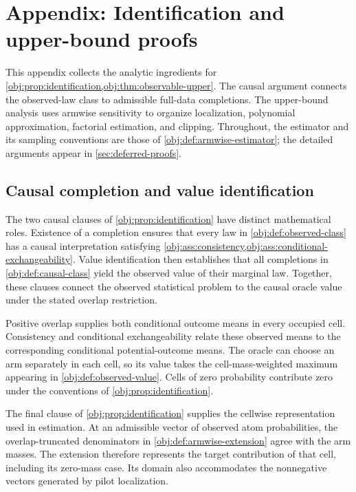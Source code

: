 \section{Appendix: Identification and upper-bound proofs}\label{sec:appendix-upper}

This appendix collects the analytic ingredients for \cref{obj:prop:identification,obj:thm:observable-upper}. The causal argument connects the observed-law class to admissible full-data completions. The upper-bound analysis uses armwise sensitivity to organize localization, polynomial approximation, factorial estimation, and clipping. Throughout, the estimator and its sampling conventions are those of \cref{obj:def:armwise-estimator}; the detailed arguments appear in \cref{sec:deferred-proofs}.

\subsection{Causal completion and value identification}

The two causal clauses of \cref{obj:prop:identification} have distinct mathematical roles. Existence of a completion ensures that every law in \cref{obj:def:observed-class} has a causal interpretation satisfying \cref{obj:ass:consistency,obj:ass:conditional-exchangeability}. Value identification then establishes that all completions in \cref{obj:def:causal-class} yield the observed value of their marginal law. Together, these clauses connect the observed statistical problem to the causal oracle value under the stated overlap restriction.

Positive overlap supplies both conditional outcome means in every occupied cell. Consistency and conditional exchangeability relate these observed means to the corresponding conditional potential-outcome means. The oracle can choose an arm separately in each cell, so its value takes the cell-mass-weighted maximum appearing in \cref{obj:def:observed-value}. Cells of zero probability contribute zero under the conventions of \cref{obj:prop:identification}.

The final clause of \cref{obj:prop:identification} supplies the cellwise representation used in estimation. At an admissible vector of observed atom probabilities, the overlap-truncated denominators in \cref{obj:def:armwise-extension} agree with the arm masses. The extension therefore represents the target contribution of that cell, including its zero-mass case. Its domain also accommodates the nonnegative vectors generated by pilot localization.

